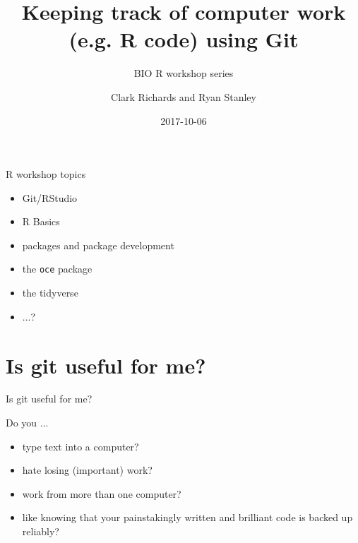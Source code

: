 \documentclass{beamer}
\title[Git MTM] %
{Keeping track of computer work (e.g. R code) using Git}
\subtitle
{BIO R workshop series}
\author
{Clark Richards and Ryan Stanley}
\date%
{2017-10-06}
\begin{document}
\begin{frame}
  \titlepage
\end{frame}


\begin{frame}[fragile]{R workshop topics}

  \begin{itemize}
  \item Git/RStudio
  \item R Basics
  \item packages and package development
  \item the \verb|oce| package
  \item the tidyverse
  \item ...?
  \end{itemize}

\end{frame}

\section{Is git useful for me?}

\begin{frame}{Is git useful for me?}

Do you ...
\begin{itemize}
\item<1-4> type text into a computer?
\item<2-4> hate losing (important) work?
\item<3-4> work from more than one computer?
\item<4> like knowing that your painstakingly written and brilliant
  code is backed up reliably?
\end{itemize}

\end{frame}
\end{document}
